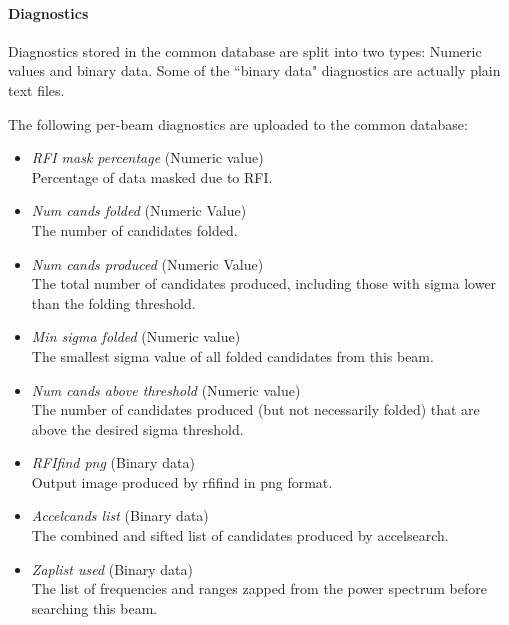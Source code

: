 \documentclass[12pt]{article}
\begin{document}
\paragraph{Diagnostics}
Diagnostics stored in the common database are split into two types: Numeric values and binary data. Some of the ``binary data" diagnostics are actually plain text files.

The following per-beam diagnostics are uploaded to the common database:
\begin{itemize}
    \item \textit{RFI mask percentage} (Numeric value) \hfill \\
        Percentage of data masked due to RFI.

    \item \textit{Num cands folded} (Numeric Value) \hfill \\
        The number of candidates folded.

    \item \textit{Num cands produced} (Numeric Value) \hfill \\
        The total number of candidates produced, including those with sigma lower than the folding threshold.

    \item \textit{Min sigma folded} (Numeric value) \hfill \\
        The smallest sigma value of all folded candidates from this beam.

    \item \textit{Num cands above threshold} (Numeric value) \hfill \\
        The number of candidates produced (but not necessarily folded) that are above the desired sigma threshold.
    
    \item \textit{RFIfind png} (Binary data) \hfill \\
        Output image produced by rfifind in png format.

    \item \textit{Accelcands list} (Binary data) \hfill \\
        The combined and sifted list of candidates produced by accelsearch.
    
    \item \textit{Zaplist used} (Binary data) \hfill \\
        The list of frequencies and ranges zapped from the power spectrum before searching this beam.
\end{itemize}
\end{document}
